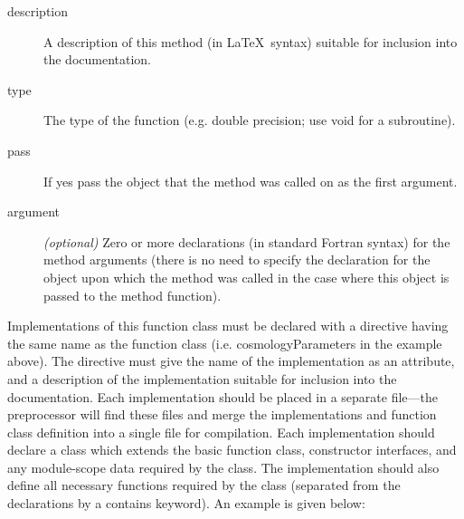 \begin{description}
\begin{description}
  \item[{\normalfont \ttfamily description}] A description of this method (in \LaTeX\ syntax) suitable for inclusion into the documentation.
  \item[{\normalfont \ttfamily type}] The type of the function (e.g. {\normalfont \ttfamily double precision}; use {\normalfont \ttfamily void} for a subroutine).
  \item[{\normalfont \ttfamily pass}] If {\normalfont \ttfamily yes} pass the object that the method was called on as the first argument.
  \item[{\normalfont \ttfamily argument}] \emph{(optional)} Zero or more declarations (in standard Fortran syntax) for the method arguments (there is no need to specify the declaration for the object upon which the method was called in the case where this object is passed to the method function).
  \end{description}
\end{description}

Implementations of this function class must be declared with a directive having the same name as the function class (i.e. {\normalfont \ttfamily cosmologyParameters} in the example above). The directive must give the name of the implementation as an attribute, and a description of the implementation suitable for inclusion into the documentation. Each implementation should be placed in a separate file---the preprocessor will find these files and merge the implementations and function class definition into a single file for compilation. Each implementation should declare a class which extends the basic function class, constructor interfaces, and any module-scope data required by the class. The implementation should also define all necessary functions required by the class (separated from the declarations by a {\normalfont \ttfamily contains} keyword). An example is given below:

